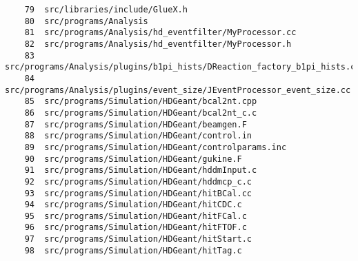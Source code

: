 \small
\begin{verbatim}
    79  src/libraries/include/GlueX.h
    80  src/programs/Analysis
    81  src/programs/Analysis/hd_eventfilter/MyProcessor.cc
    82  src/programs/Analysis/hd_eventfilter/MyProcessor.h
    83  src/programs/Analysis/plugins/b1pi_hists/DReaction_factory_b1pi_hists.cc
    84  src/programs/Analysis/plugins/event_size/JEventProcessor_event_size.cc
    85  src/programs/Simulation/HDGeant/bcal2nt.cpp
    86  src/programs/Simulation/HDGeant/bcal2nt_c.c
    87  src/programs/Simulation/HDGeant/beamgen.F
    88  src/programs/Simulation/HDGeant/control.in
    89  src/programs/Simulation/HDGeant/controlparams.inc
    90  src/programs/Simulation/HDGeant/gukine.F
    91  src/programs/Simulation/HDGeant/hddmInput.c
    92  src/programs/Simulation/HDGeant/hddmcp_c.c
    93  src/programs/Simulation/HDGeant/hitBCal.cc
    94  src/programs/Simulation/HDGeant/hitCDC.c
    95  src/programs/Simulation/HDGeant/hitFCal.c
    96  src/programs/Simulation/HDGeant/hitFTOF.c
    97  src/programs/Simulation/HDGeant/hitStart.c
    98  src/programs/Simulation/HDGeant/hitTag.c
\end{verbatim}
